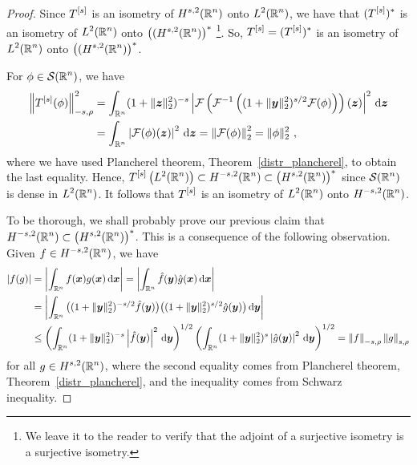 \begin{proof}
Since $\displaystyle T^{[s]}$ is an isometry of $\displaystyle H^{s,2}(\mathbb{R}^n)$
onto $\displaystyle L^2(\mathbb{R}^n)$, we have that
$\displaystyle (T^{[s]})^\ast$ is an isometry of 
$\displaystyle L^2(\mathbb{R}^n)$ onto
$\displaystyle \big((H^{s,2}(\mathbb{R}^n)\big)^\ast$
\footnote{We leave it to the reader to verify that the adjoint of a
surjective isometry is a surjective isometry.}.  So,
$\displaystyle T^{[s]} = (T^{[s]})^\ast$ is an isometry of 
$\displaystyle L^2(\mathbb{R}^n)$ onto $\displaystyle \big((H^{s,2}(\mathbb{R}^n)\big)^\ast$.

For $\displaystyle \phi \in \mathcal{S}(\mathbb{R}^n)$, we have
\begin{align*}
\left\| T^{[s]}(\phi)\right\|_{-s,\rho}^2
&= \int_{\mathbb{R}^n} (1+\|{\bm{z}}\|_2^2)^{-s}
\left| \mathcal{F}\left( \mathcal{F}^{-1}\left(
(1+\|{\bm{y}}\|_2^2)^{s/2} \mathcal{F}(\phi)\right)\right)({\bm{z}})
\right|^2 \,\mathrm{d}{{\bm{z}}} \\
&= \int_{\mathbb{R}^n} \left| \mathcal{F}(\phi) ({\bm{z}}) \right|^2 \,\mathrm{d}{{\bm{z}}}
= \left\| \mathcal{F}(\phi) \right\|_2^2 = \|\phi\|_2^2 \ ,
\end{align*}
where we have used Plancherel theorem,
Theorem~\ref{distr_plancherel}, to obtain the last equality.
Hence, $\displaystyle T^{[s]}\left(L^2(\mathbb{R}^n)\right) \subset H^{-s,2}(\mathbb{R}^n)
\subset \big(H^{s,2}(\mathbb{R}^n)\big)^\ast$ since $\displaystyle
\mathcal{S}(\mathbb{R}^n)$ is dense in $\displaystyle L^2(\mathbb{R}^n)$.  It follows that
$\displaystyle T^{[s]}$ is an isometry of 
$\displaystyle L^2(\mathbb{R}^n)$ onto $\displaystyle H^{-s,2}(\mathbb{R}^n)$.

To be thorough, we shall probably prove our previous claim that
$\displaystyle H^{-s,2}(\mathbb{R}^n) \subset \big(H^{s,2}(\mathbb{R}^n)\big)^\ast$.
This is a consequence of the following observation.
Given $\displaystyle f \in H^{-s,2}(\mathbb{R}^n)$, we have
\begin{align*}
|f(g)| &= \left| \int_{\mathbb{R}^n} f({\bm{x}}) g({\bm{x}}) \,\mathrm{d}{{\bm{x}}} \right|
= \left| \int_{\mathbb{R}^n} \hat{f}({\bm{y}}) \hat{g}({\bm{x}}) \,\mathrm{d}{{\bm{x}}} \right| \\
&= \left| \int_{\mathbb{R}^n} \big( (1+\|{\bm{y}}\|_2^2)^{-s/2}\hat{f}({\bm{y}})\big)
\big( (1+\|{\bm{y}}\|_2^2)^{s/2} \hat{g}({\bm{y}}) \big) \,\mathrm{d}{{\bm{y}}} \right| \\
&\leq \left( \int_{\mathbb{R}^n} (1+\|{\bm{y}}\|_2^2)^{-s}
\left|\hat{f}({\bm{y}})\right|^2 \,\mathrm{d}{{\bm{y}}} \right)^{1/2}
\left( \int_{\mathbb{R}^n} (1+\|{\bm{y}}\|_2^2)^s\left|\hat{g}({\bm{y}})\right|^2
\,\mathrm{d}{{\bm{y}}} \right)^{1/2}
= \left\| f\right\|_{-s,\rho} \left\| g \right\|_{s,\rho} 
\end{align*}
for all $\displaystyle g \in H^{s,2}(\mathbb{R}^n)$, where the second
equality comes from Plancherel theorem,
Theorem~\ref{distr_plancherel}, and the inequality comes from Schwarz
inequality.
\end{proof}

